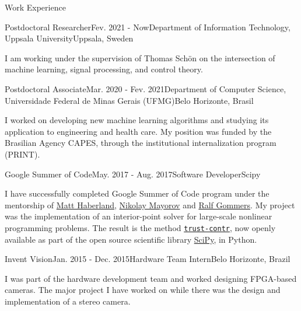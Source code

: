 \documentclass{resume} %
\begin{document}
\begin{rSection}{Work Experience}


  \begin{rSubsection}{Postdoctoral Researcher}{Fev. 2021 - Now}{Department of Information Technology, Uppsala University}{Uppsala, Sweden}

      \item I am working under the supervision of Thomas Sch\"on on the intersection of machine learning, signal processing, and control theory.
  \end{rSubsection}

  \begin{rSubsection}{Postdoctoral Associate}{Mar. 2020 - Fev. 2021}{Department of Computer Science, Universidade Federal de Minas Gerais (UFMG)}{Belo Horizonte, Brasil}

  \item I worked on developing new machine learning algorithms and studying its application to engineering and health care. My position was funded by the Brasilian Agency CAPES, through the institutional internalization program (PRINT).
  \end{rSubsection}


  \begin{rSubsection}{Google Summer of Code}{May. 2017 - Aug. 2017}{Software Developer}{Scipy}

  \item I have successfully completed Google Summer of Code program under the mentorship
    of \href{http://mdhaber.wixsite.com/home}{Matt Haberland},
    \href{https://github.com/nmayorov}{Nikolay Mayorov} and
    \href{https://www.linkedin.com/in/ralf-gommers-97317b4}{Ralf Gommers}. My project was the implementation of an interior-point solver for large-scale nonlinear programming problems. The result is the method \href{http://scipy.github.io/devdocs/optimize.minimize-trustconstr.html}{\texttt{trust-contr}}, now openly available as part of the open source scientific library \href{https://www.scipy.org}{SciPy}, in Python.
  \end{rSubsection}

\begin{rSubsection}{Invent Vision}{Jan. 2015 - Dec. 2015}{Hardware Team Intern}{Belo Horizonte, Brazil}
\item I was part of the hardware development team and worked designing FPGA-based cameras. The major project I have worked on while there was the design and implementation of a stereo camera.
\end{rSubsection}


\end{rSection}
\end{document}

